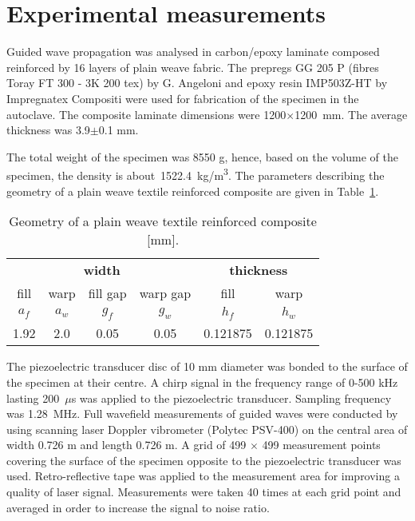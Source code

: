 \documentclass[preprint,12pt]{elsarticle}
\begin{document}
\section{Experimental measurements \label{sec:experiment}}
Guided wave propagation was analysed in carbon/epoxy laminate composed reinforced 
by 16 layers of plain weave fabric. The prepregs GG 205  P (fibres Toray FT 300 - 3K 
200 tex) by G. Angeloni and epoxy resin IMP503Z-HT by Impregnatex Compositi were 
used for fabrication of the specimen in the autoclave. The composite laminate 
dimensions were 1200\(\times\)1200~mm. The average thickness was 3.9\(\pm\)0.1 
mm. 

The total weight of the specimen was 8550 g, hence, based on the volume of the specimen, the density is about~1522.4~kg/m\textsuperscript{3}.
The parameters describing the geometry of a plain weave textile reinforced composite are given in Table~\ref{tab:weave_geo}. 
 \begin{table}[h]
	\renewcommand{\arraystretch}{1.3}
	\centering \footnotesize
	\caption{Geometry of a plain weave textile reinforced composite [mm].}
	\begin{tabular}{cccccc} 
		\toprule
		\multicolumn{4}{c}{\textbf{width} }	& \multicolumn{2}{c}{\textbf{thickness} }  \\ 
	    \cmidrule(lr){1-4} \cmidrule(lr){5-6} 
		fill & warp & fill gap& warp gap& fill & warp\\
		\(a_f\) &\(a_w\)& \(g_f\)  & \(g_w\)  & \(h_f\)& \(h_w\) \\ 
		\cmidrule(lr){1-2} \cmidrule(lr){3-4} \cmidrule(lr){5-6}
		1.92 &2.0& 0.05& 0.05 & 0.121875 & 0.121875 \\
		\bottomrule 
	\end{tabular} 
	\label{tab:weave_geo}
\end{table}

The piezoelectric transducer disc of 10 mm diameter  was bonded to the surface of the 
specimen at their centre. A chirp signal in the frequency range of 0-500 kHz lasting 
200~\(\mu\)s was applied to the piezoelectric transducer. Sampling frequency was 
1.28~MHz. Full wavefield measurements of guided waves were conducted by using 
scanning laser Doppler vibrometer (Polytec PSV-400) on the central area of width 
0.726 m and length 0.726 m. A grid of 499 \(\times\) 499 measurement points covering 
the surface of the specimen opposite to the piezoelectric transducer was used. 
Retro-reflective tape was applied to the measurement area for improving a quality of 
laser signal. Measurements were taken 40 times at each grid point and averaged in 
order to increase the signal to noise ratio.
\end{document}
